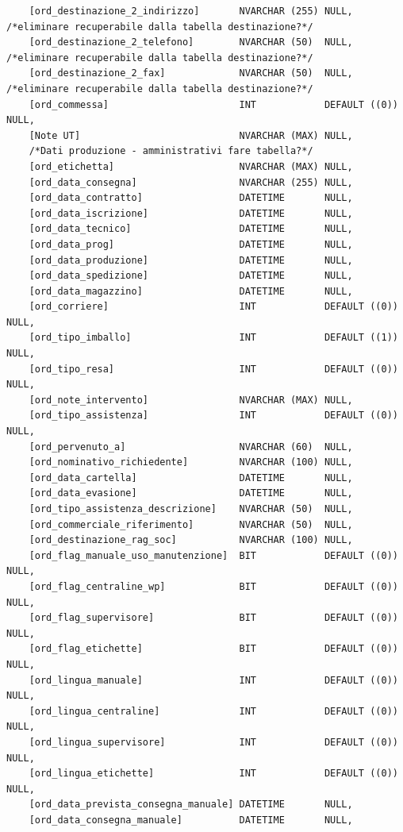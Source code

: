 \documentclass[12pt]{article}
\begin{document}
\begin{lstlisting}
    [ord_destinazione_2_indirizzo]       NVARCHAR (255) NULL,   /*eliminare recuperabile dalla tabella destinazione?*/
    [ord_destinazione_2_telefono]        NVARCHAR (50)  NULL,   /*eliminare recuperabile dalla tabella destinazione?*/
    [ord_destinazione_2_fax]             NVARCHAR (50)  NULL,   /*eliminare recuperabile dalla tabella destinazione?*/
    [ord_commessa]                       INT            DEFAULT ((0)) NULL,
    [Note UT]                            NVARCHAR (MAX) NULL,
    /*Dati produzione - amministrativi fare tabella?*/   
    [ord_etichetta]                      NVARCHAR (MAX) NULL,
    [ord_data_consegna]                  NVARCHAR (255) NULL,
    [ord_data_contratto]                 DATETIME       NULL,
    [ord_data_iscrizione]                DATETIME       NULL,
    [ord_data_tecnico]                   DATETIME       NULL,
    [ord_data_prog]                      DATETIME       NULL,
    [ord_data_produzione]                DATETIME       NULL,
    [ord_data_spedizione]                DATETIME       NULL,
    [ord_data_magazzino]                 DATETIME       NULL,
    [ord_corriere]                       INT            DEFAULT ((0)) NULL,
    [ord_tipo_imballo]                   INT            DEFAULT ((1)) NULL,
    [ord_tipo_resa]                      INT            DEFAULT ((0)) NULL,
    [ord_note_intervento]                NVARCHAR (MAX) NULL,
    [ord_tipo_assistenza]                INT            DEFAULT ((0)) NULL,
    [ord_pervenuto_a]                    NVARCHAR (60)  NULL,
    [ord_nominativo_richiedente]         NVARCHAR (100) NULL,
    [ord_data_cartella]                  DATETIME       NULL,
    [ord_data_evasione]                  DATETIME       NULL,
    [ord_tipo_assistenza_descrizione]    NVARCHAR (50)  NULL,
    [ord_commerciale_riferimento]        NVARCHAR (50)  NULL,
    [ord_destinazione_rag_soc]           NVARCHAR (100) NULL,
    [ord_flag_manuale_uso_manutenzione]  BIT            DEFAULT ((0)) NULL,
    [ord_flag_centraline_wp]             BIT            DEFAULT ((0)) NULL,
    [ord_flag_supervisore]               BIT            DEFAULT ((0)) NULL,
    [ord_flag_etichette]                 BIT            DEFAULT ((0)) NULL,
    [ord_lingua_manuale]                 INT            DEFAULT ((0)) NULL,
    [ord_lingua_centraline]              INT            DEFAULT ((0)) NULL,
    [ord_lingua_supervisore]             INT            DEFAULT ((0)) NULL,
    [ord_lingua_etichette]               INT            DEFAULT ((0)) NULL,
    [ord_data_prevista_consegna_manuale] DATETIME       NULL,
    [ord_data_consegna_manuale]          DATETIME       NULL,

\end{lstlisting}
\end{document}
